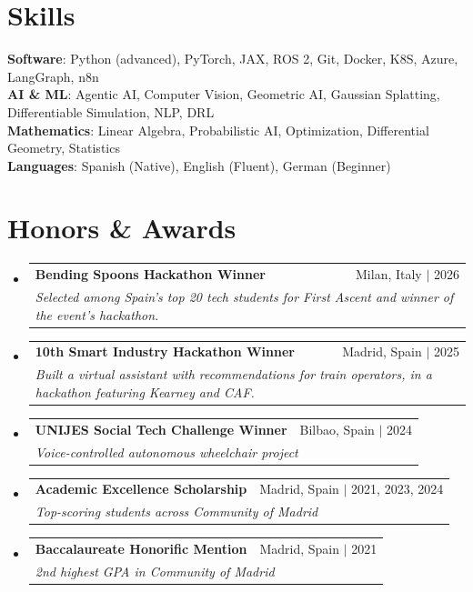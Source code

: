 \documentclass[a4paper,11pt]{article}
\makeatletter
\newcommand{\resumeAward}[3]{
  \vspace{-2pt}\item
    \begin{tabular*}{0.97\textwidth}[t]{l@{\extracolsep{\fill}}r}
      \textbf{#1} & #2 \\
      \multicolumn{2}{l}{\textit{\small#3}} \\
    \end{tabular*}\vspace{-7pt}
}
\newcommand{\resumeSubHeadingListStart}{\begin{itemize}[leftmargin=0.15in, label={}]}
\newcommand{\resumeSubHeadingListEnd}{\end{itemize}}
\makeatother
\begin{document}
\section{Skills}
\begin{itemize}[leftmargin=0.15in, label={}]
  \small{\item{
  \textbf{Software}{: Python (advanced), PyTorch, JAX, ROS 2, Git, Docker, K8S, Azure, LangGraph, n8n} \\
  \textbf{AI \& ML}{: Agentic AI, Computer Vision, Geometric AI, Gaussian Splatting, Differentiable Simulation, NLP, DRL} \\
  \textbf{Mathematics}{: Linear Algebra, Probabilistic AI, Optimization, Differential Geometry, Statistics} \\
  \textbf{Languages}{: Spanish (Native), English (Fluent), German (Beginner)}
  }}
\end{itemize}

\section{Honors \& Awards}
\resumeSubHeadingListStart
\resumeAward
    {Bending Spoons Hackathon Winner}{Milan, Italy $|$ 2026}
    {Selected among Spain's top 20 tech students for First Ascent and winner of the event's hackathon.}
\resumeAward
    {10th Smart Industry Hackathon Winner}{Madrid, Spain $|$ 2025}
    {Built a virtual assistant with recommendations for train operators, in a hackathon featuring Kearney and CAF.}
  \resumeAward
    {UNIJES Social Tech Challenge Winner}{Bilbao, Spain $|$ 2024}
    {Voice-controlled autonomous wheelchair project}
\resumeAward
    {Academic Excellence Scholarship}{Madrid, Spain $|$ 2021, 2023, 2024}
    {Top-scoring students across Community of Madrid}
\resumeAward
    {Baccalaureate Honorific Mention}{Madrid, Spain $|$ 2021}
    {2nd highest GPA in Community of Madrid}
  
\resumeSubHeadingListEnd
\end{document}
